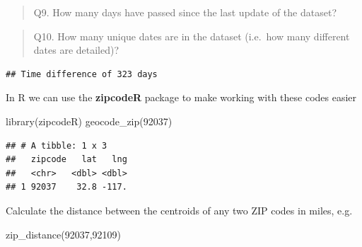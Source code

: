 \documentclass[
]{article}
\newenvironment{Shaded}{\begin{snugshade}}{\end{snugshade}}
\newcommand{\CommentTok}[1]{\textcolor[rgb]{0.56,0.35,0.01}{\textit{#1}}}
\newcommand{\DecValTok}[1]{\textcolor[rgb]{0.00,0.00,0.81}{#1}}
\newcommand{\FunctionTok}[1]{\textcolor[rgb]{0.00,0.00,0.00}{#1}}
\newcommand{\NormalTok}[1]{#1}
\newcommand{\OtherTok}[1]{\textcolor[rgb]{0.56,0.35,0.01}{#1}}
\newcommand{\SpecialCharTok}[1]{\textcolor[rgb]{0.00,0.00,0.00}{#1}}
\newcommand{\StringTok}[1]{\textcolor[rgb]{0.31,0.60,0.02}{#1}}
\begin{document}
\begin{quote}
Q9. How many days have passed since the last update of the dataset?
\end{quote}

\begin{Shaded}
\end{Shaded}

\begin{quote}
Q10. How many unique dates are in the dataset (i.e.~how many different
dates are detailed)?
\end{quote}

\begin{Shaded}
\end{Shaded}

\begin{verbatim}
## Time difference of 323 days
\end{verbatim}

In R we can use the \textbf{zipcodeR} package to make working with these
codes easier

\begin{Shaded}
\begin{Highlighting}[]
\FunctionTok{library}\NormalTok{(zipcodeR)}
\FunctionTok{geocode\_zip}\NormalTok{(}\StringTok{\textquotesingle{}92037\textquotesingle{}}\NormalTok{)}
\end{Highlighting}
\end{Shaded}

\begin{verbatim}
## # A tibble: 1 x 3
##   zipcode   lat   lng
##   <chr>   <dbl> <dbl>
## 1 92037    32.8 -117.
\end{verbatim}

Calculate the distance between the centroids of any two ZIP codes in
miles, e.g.

\begin{Shaded}
\begin{Highlighting}[]
\FunctionTok{zip\_distance}\NormalTok{(}\StringTok{\textquotesingle{}92037\textquotesingle{}}\NormalTok{,}\StringTok{\textquotesingle{}92109\textquotesingle{}}\NormalTok{)}
\end{Highlighting}
\end{Shaded}
\end{document}

